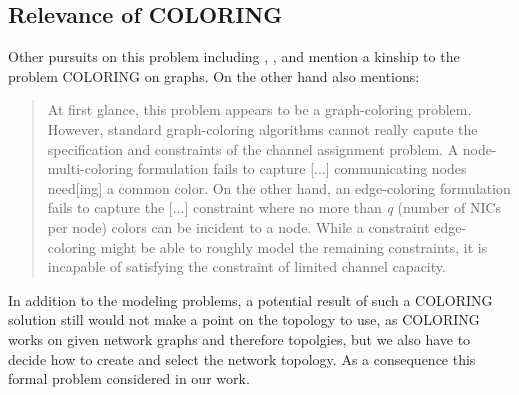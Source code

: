   \subsection{Relevance of COLORING}
    Other pursuits on this problem including \cite{BFS-CA}, \cite{CTA}, \cite{caa_tricky} and \cite{katzela} mention a kinship to the problem COLORING on graphs.
    On the other hand \cite{caa_tricky} also mentions:
    \begin{quote}
     At first glance, this problem appears to be a graph-coloring problem. However, standard graph-coloring algorithms cannot really capute the specification and constraints 
     of the channel assignment problem. A node-multi-coloring formulation fails to capture [...] communicating nodes need[ing] a common color. On the other hand,
     an edge-coloring formulation fails to capture the [...] constraint where no more than \textit{q} (number of NICs per node) colors can be incident to a node.
     While a constraint edge-coloring might be able to roughly model the remaining constraints, it is incapable of satisfying the constraint of limited channel capacity.
    \end{quote}
    In addition to the modeling problems, a potential result of such a COLORING solution still would not make a point on the topology to use,
    as COLORING works on given network graphs and therefore topolgies, but we also have to decide how to create and select the network topology.
    As a consequence this formal problem considered in our work.
